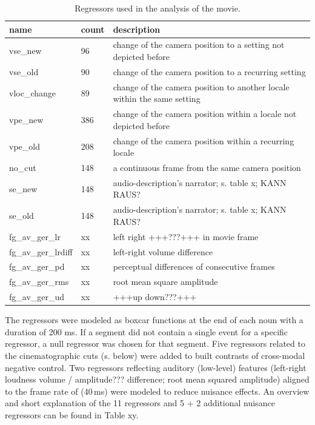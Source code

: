 \documentclass[english]{article}
\begin{document}
\begin{table}
\caption{Regressors used in the analysis of the movie.}
\begin{tabular}{lll}
\toprule
\textbf{name} & \textbf{count} & \textbf{description} \\
\midrule
vse\_new & 96 & change of the camera position to a setting not depicted before \\
vse\_old & 90 & change of the camera position to a recurring setting \\
vloc\_change & 89 & change of the camera position to another locale within the same setting \\
vpe\_new & 386 & change of the camera position within a locale not depicted before \\
vpe\_old & 208 & change of the camera position within a recurring locale \\
no\_cut & 148 & a continuous frame from the same camera position \\
se\_new & 148 & audio-description's narrator; s. table x; KANN RAUS? \\
se\_old & 148 & audio-description's narrator; s. table x; KANN RAUS? \\
fg\_av\_ger\_lr & xx & left right +++???+++ in movie frame  \\
fg\_av\_ger\_lrdiff & xx & left-right volume difference \\
fg\_av\_ger\_pd & xx & perceptual differences of consecutive frames \\
fg\_av\_ger\_rms & xx & root mean square amplitude \\
fg\_av\_ger\_ud & xx & +++up down???+++ \\
\bottomrule
\end{tabular}
\end{table}
The regressors were modeled as boxcar functions at the end of each noun with a duration of 200 ms.
If a segment did not contain a single event for a specific regressor, a null regressor was chosen for that segment.
Five regressors related to the cinematographic cuts (s. below) were added to built contrasts of cross-modal negative control.
Two regressors reflecting auditory (low-level) features (left-right loudness volume / amplitude??? difference; root mean squared amplitude) aligned to the frame rate of (40\,ms) were modeled to reduce nuisance effects.
An overview and short explanation of the 11 regressors and 5 + 2 additional nuisance regressors can be found in Table xy.
\end{document}
